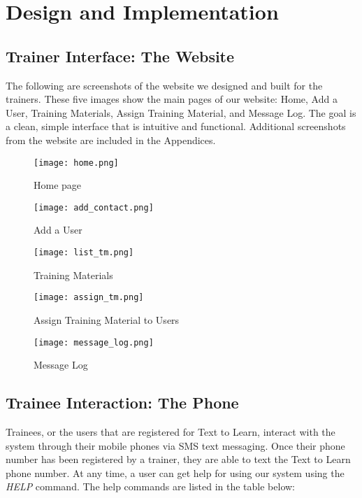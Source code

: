 \chapter{Design and Implementation}

\section{Trainer Interface: The Website}
The following are screenshots of the website we designed and built for the trainers. These five images show the main pages of our website: Home, Add a User, Training Materials, Assign Training Material, and Message Log. The goal is a clean, simple interface that is intuitive and functional. Additional screenshots from the website are included in the Appendices.

\begin{figure}[H]
	\centering
	\texttt{[image: home.png]}
	\caption{Home page}
\end{figure}

\begin{figure}[H]
	\centering
	\texttt{[image: add\_contact.png]}
	\caption{Add a User}
\end{figure}

\begin{figure}[H]
	\centering
	\texttt{[image: list\_tm.png]}
	\caption{Training Materials}
\end{figure}

\begin{figure}[H]
	\centering
	\texttt{[image: assign\_tm.png]}
	\caption{Assign Training Material to Users}
\end{figure}

\begin{figure}[H]
	\centering
	\texttt{[image: message\_log.png]}
	\caption{Message Log}
\end{figure}


\section{Trainee Interaction: The Phone}
Trainees, or the users that are registered for Text to Learn, interact with the system through their mobile phones via SMS text messaging. Once their phone number has been registered by a trainer, they are able to text the Text to Learn phone number. At any time, a user can get help for using our system using the \textit{HELP} command. The help commands are listed in the table below:

